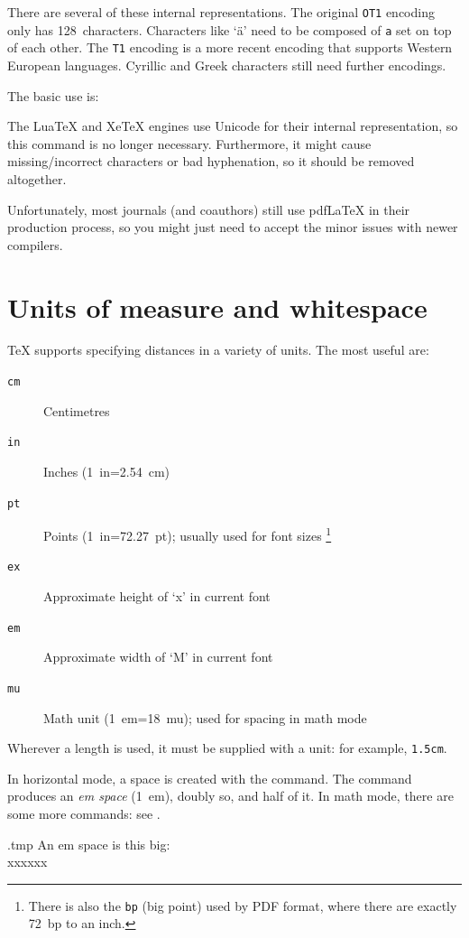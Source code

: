 There are several of these internal representations.
The original \verb|OT1| encoding only has 128~characters.
Characters like `ä' need to be composed of \texttt{\textasciidieresis a} set on top of each other.
The \verb|T1| encoding is a more recent encoding that supports Western European languages.
Cyrillic and Greek characters still need further encodings.

The basic use is:
\begin{ExampleCode}
\usepackage[T1]{fontenc}
\end{ExampleCode}

The LuaTeX and XeTeX engines use Unicode for their internal representation,
so this command is no longer necessary.
Furthermore, it might cause missing/incorrect characters or bad hyphenation,
so it should be removed altogether.

\begin{practices}
Unfortunately, most journals (and coauthors)
still use pdfLaTeX in their production process,
so you might just need to accept the minor issues with newer compilers.
\end{practices}



%
%
%
\section{Units of measure and whitespace}

\TeX{} supports specifying distances in a variety of units.
The most useful are:
\begin{description}
    \item[\texttt{cm}] Centimetres
    \item[\texttt{in}] Inches (1~in=2.54~cm)
    \item[\texttt{pt}] Points (1~in=72.27~pt); usually used for font sizes%
        \footnote{There is also the \texttt{bp} (big point) used by PDF format,
        where there are exactly 72~bp to an inch.}
    \item[\texttt{ex}] Approximate height of `x' in current font
    \item[\texttt{em}] Approximate width of `M' in current font
    \item[\texttt{mu}] Math unit (1~em=18~mu); used for spacing in math mode
\end{description}
%
Wherever a length is used, it must be supplied with a unit: for example, \verb|1.5cm|.

In horizontal mode, a space is created with the  command.
The  command produces an \emph{em space} (1~em),  doubly so,
and  half of it.
In math mode, there are some more commands: see .
%
\begin{VerbatimOut}{\jobname.tmp}
An em space is this big:\\
xxx\hspace{1em}xxx
\end{VerbatimOut}
\ShowExample


